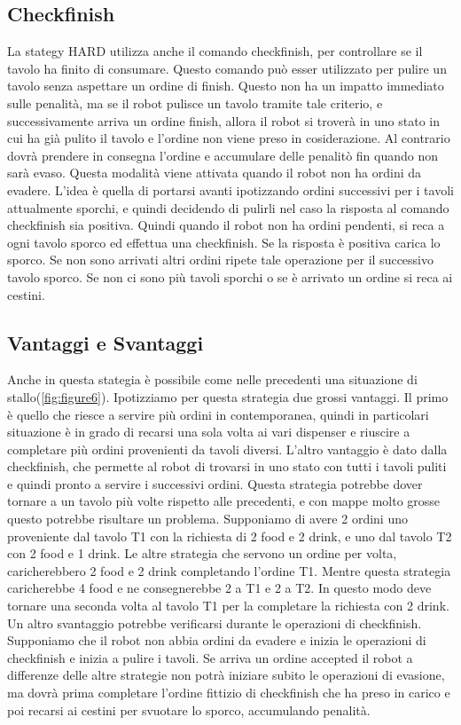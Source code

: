 \subsection{Checkfinish}
La stategy HARD utilizza anche il comando checkfinish, per controllare se il tavolo ha finito di consumare. Questo comando può esser utilizzato per pulire un tavolo senza aspettare un ordine di finish. Questo non ha un impatto immediato sulle penalità, ma se il robot pulisce un tavolo tramite tale criterio, e successivamente arriva un ordine finish, allora il robot si troverà in uno stato in cui ha già pulito il tavolo e l'ordine non viene preso in cosiderazione. Al contrario dovrà prendere in consegna l'ordine e accumulare delle penalitò fin quando non sarà evaso.
Questa modalità viene attivata quando il robot non ha ordini da evadere. L'idea è quella di portarsi avanti ipotizzando ordini successivi per i tavoli attualmente sporchi, e quindi decidendo di pulirli nel caso la risposta al comando checkfinish sia positiva. Quindi quando il robot non ha ordini pendenti, si reca a ogni tavolo sporco ed effettua una checkfinish. Se la risposta è positiva carica lo sporco. Se non sono arrivati altri ordini ripete tale operazione per il successivo tavolo sporco. Se non ci sono più tavoli sporchi o se è arrivato un ordine si reca ai cestini.


\subsection{Vantaggi e Svantaggi}
Anche in questa stategia è possibile come nelle precedenti una situazione di stallo(\ref{fig:figure6}).
Ipotizziamo per questa strategia due grossi vantaggi. Il primo è quello che riesce a servire più ordini in contemporanea, quindi in particolari situazione è in grado di recarsi una sola volta ai vari dispenser e riuscire a completare più ordini provenienti da tavoli diversi. L'altro vantaggio è dato dalla checkfinish, che permette al robot di trovarsi in uno stato con tutti i tavoli puliti e quindi pronto a servire i successivi ordini.
Questa strategia potrebbe dover tornare a un tavolo più volte rispetto alle precedenti, e con mappe molto grosse questo potrebbe risultare un problema. Supponiamo di avere 2 ordini uno proveniente dal tavolo T1 con la richiesta di 2 food e 2 drink, e uno dal tavolo T2 con 2 food e 1 drink. Le altre strategia che servono un ordine per volta, caricherebbero 2 food e 2 drink completando l'ordine T1. Mentre questa strategia caricherebbe 4 food e ne consegnerebbe 2 a T1 e 2 a T2. In questo modo deve tornare una seconda volta al tavolo T1 per la completare la richiesta con 2 drink.
Un altro svantaggio potrebbe verificarsi durante le operazioni di checkfinish. Supponiamo che il robot non abbia ordini da evadere e inizia le operazioni di checkfinish e inizia a pulire i tavoli. Se arriva un ordine accepted il robot a differenze delle altre strategie non potrà iniziare subito le operazioni di evasione, ma dovrà prima completare l'ordine fittizio di checkfinish che ha preso in carico e poi recarsi ai cestini per svuotare lo sporco, accumulando penalità.

